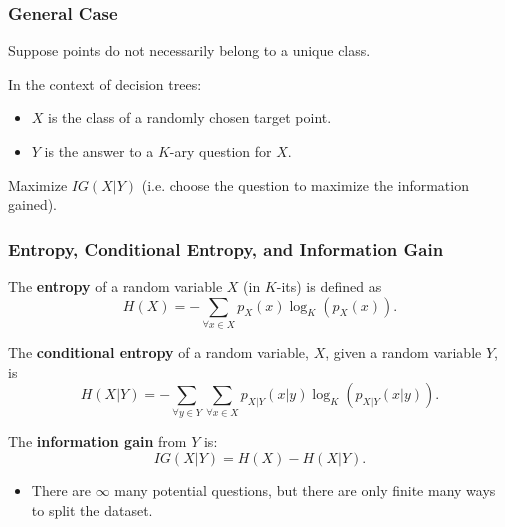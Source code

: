 \subsubsection{General Case}
\begin{motivation}
    Suppose points do not necessarily belong to a unique class.
    \vspace{1em}

    In the context of decision trees:
    \begin{itemize}
        \item \(X\) is the class of a randomly chosen target point.
        \item \(Y\) is the answer to a \(K\)-ary question for \(X\).
    \end{itemize}

    Maximize \(IG(X|Y)\) (i.e. choose the question to maximize the information gained).
\end{motivation}

\subsubsection{Entropy, Conditional Entropy, and Information Gain}
\begin{definition}
    The \textbf{entropy} of a random variable \(X\) (in \(K\)-its) is defined as
    \begin{equation*}
        H(X) = -\sum_{\forall x \in X} p_X(x) \log_K(p_X(x)).
    \end{equation*}

    The \textbf{conditional entropy} of a random variable, \(X\), given a random variable \(Y\), is
    \begin{equation*}
        H(X|Y) = -\sum_{\forall y \in Y} \sum_{\forall x \in X} p_{X|Y}(x | y) \log_K(p_{X|Y}(x|y)).
    \end{equation*}

    The \textbf{information gain} from \(Y\) is:
    \begin{equation*}
        IG(X|Y) = H(X) - H(X|Y).
    \end{equation*}
\end{definition}

\begin{warning}
    \begin{itemize}
        \item There are $\infty$ many potential questions, but there are only finite many ways to split the dataset. 
    \end{itemize}
\end{warning}
\newpage

